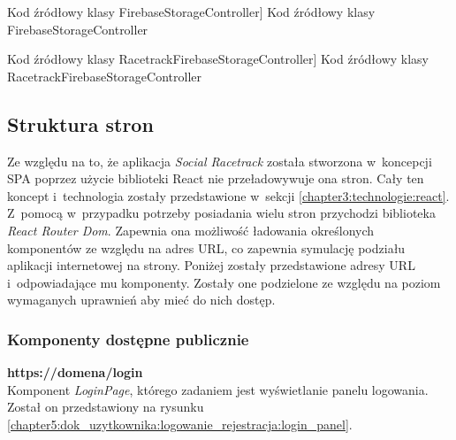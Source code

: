 \documentclass[../Kamil_Kowalewski_Main.tex]{subfiles}
\begin{document}
{{{            \begin{code}[H]
                
                \caption
                [Kod źródłowy klasy FirebaseStorageController]
                {Kod źródłowy klasy FirebaseStorageController}
                \label{chapter4:dok_techniczna:implementacja:api:generic}
            \end{code}

            \begin{code}[H]
                
                \caption
                [Kod źródłowy klasy RacetrackFirebaseStorageController]
                {Kod źródłowy klasy RacetrackFirebaseStorageController}
                \label{chapter4:dok_techniczna:implementacja:api:concrete}
            \end{code}
        }

        \subsection{Struktura stron}
        \label{chapter4:dok_techniczna:implementacja:struktura_stron} {
            Ze względu na to, że aplikacja \textit{Social Racetrack} została stworzona
            w~koncepcji SPA poprzez użycie biblioteki React nie przeładowywuje
            ona stron. Cały ten koncept i~technologia zostały przedstawione w~sekcji
            \ref{chapter3:technologie:react}. Z~pomocą w~przypadku potrzeby posiadania
            wielu stron przychodzi biblioteka \textit{React Router Dom}. Zapewnia ona
            możliwość ładowania określonych komponentów ze względu na adres URL, co
            zapewnia symulację podziału aplikacji internetowej na strony. Poniżej zostały
            przedstawione adresy URL i~odpowiadające mu komponenty. Zostały one
            podzielone ze względu na poziom wymaganych uprawnień aby mieć do nich dostęp.

            \subsubsection{Komponenty dostępne publicznie}
            \label{chapter4:dok_techniczna:implementacja:struktura_stron:publiczne} {

                \noindent\textbf{https://domena/login}\\
                \indent Komponent \textit{LoginPage}, którego zadaniem jest wyświetlanie
                panelu logowania. Został on przedstawiony na rysunku
                \ref{chapter5:dok_uzytkownika:logowanie_rejestracja:login_panel}.

}}}}
\end{document}
